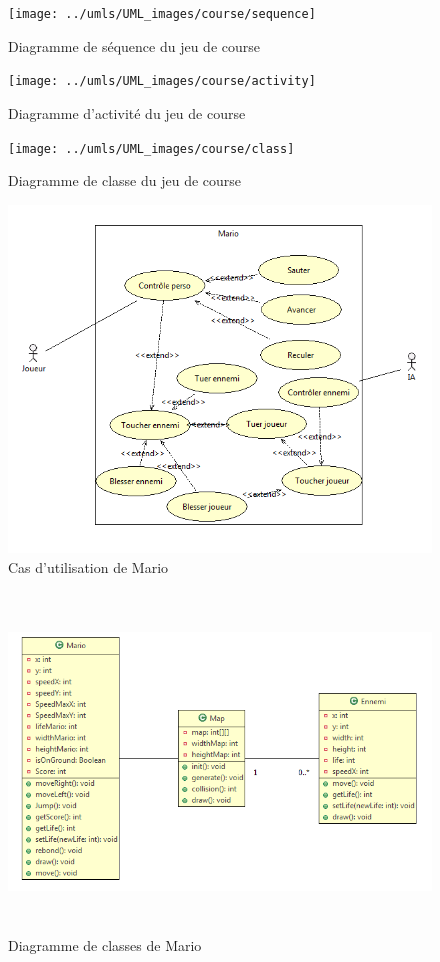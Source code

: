 \clearpage
{}

\begin{figure}[h]
 \centering
 \texttt{[image: ../umls/UML\_images/course/sequence]} \hfill
 \caption{Diagramme de séquence du jeu de course}
\end{figure}

\begin{figure}[h]
 \centering
 \texttt{[image: ../umls/UML\_images/course/activity]} \hfill
 \caption{Diagramme d'activité du jeu de course}
\end{figure}

\begin{figure}[h]
 \centering
 \texttt{[image: ../umls/UML\_images/course/class]} \hfill
 \caption{Diagramme de classe du jeu de course}
\end{figure}


\clearpage
{}

\begin{figure}[h]
 \centering
 \includegraphics[width=\textwidth]{../umls/UML_images/Mario/Utilisation} \hfill
 \caption{Cas d'utilisation de Mario}
\end{figure}

\begin{figure}[h]
 \centering
 \includegraphics[height=9cm]{../umls/UML_images/Mario/Class} \hfill
 \caption{Diagramme de classes de Mario}
\end{figure}

